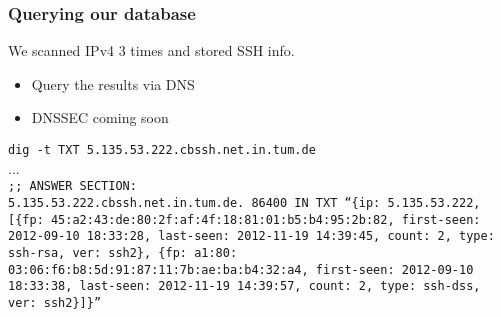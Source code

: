 \begin{frame}
\frametitle{Querying our database}
\begin{block}{We scanned IPv4 3 times and stored SSH info.}
\begin{itemize}
  \item Query the results via DNS
  \item DNSSEC coming soon
\end{itemize}
\end{block}
\begin{block}{}
\texttt{dig -t TXT 5.135.53.222.cbssh.net.in.tum.de}\\
...\\
\scriptsize{\texttt{;; ANSWER SECTION:\\
5.135.53.222.cbssh.net.in.tum.de. 86400 IN TXT ``\{ip: 5.135.53.222, {[\bf\{fp: 45:a2:43:de:80:2f:af:4f:18:81:01:b5:b4:95:2b:82, first-seen: 2012-09-10 18:33:28, last-seen: 2012-11-19 14:39:45, count: 2, type: ssh-rsa, ver: ssh2\}}, \{fp: a1:80:\\03:06:f6:b8:5d:91:87:11:7b:ae:ba:b4:32:a4, first-seen: 2012-09-10\\18:33:38, last-seen: 2012-11-19 14:39:57, count: 2, type: ssh-dss, ver: ssh2\}]\}''}}
\end{block}
\end{frame}


